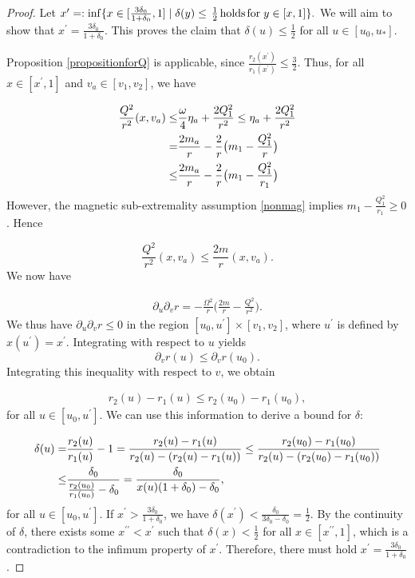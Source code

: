 \documentclass{article}[11pt]
\newcommand{\hsp}{\hspace{.5mm}}
\numberwithin{equation}{section}
\begin{document}
\begin{proof}
Let $x^{\prime} =: \inf \{ x \in [\frac{3\delta_0}{1+\delta_0},1] \mid \delta(y)\leq \hsp  \frac{1}{2}\hsp \text{holds} \hsp \text{for}\hspace{1mm} y\in [x,1]\}.$ We will aim to show that $x^{\prime} = \frac{3\delta_0}{1+\delta_0}.$ This proves the claim that $\delta(u)\leq \frac{1}{2}$ for all $u\in [u_0,u_*]$.

\vspace{3mm}

\noindent Proposition \eqref{propositionforQ} is applicable, since $\frac{r_2(x^{\prime})}{r_1(x^{\prime})}\leq \frac{3}{2}$. Thus, for all $x \in [x^{\prime},1]$ and $v_a \in [v_1,v_2]$, we have

\begin{align} \notag 
\frac{Q^2}{r^2}(x,v_a) \leq& \frac{\omega}{4}\eta_a + \frac{2Q_1^2}{r^2} \leq \eta_a + \frac{2Q_1^2}{r^2} \\ =& \frac{2m_a}{r}- \frac{2}{r}\big(m_1-\frac{Q_1^2}{r}\big) \notag \\ \leq& \frac{2m_a}{r}- \frac{2}{r}\big(m_1-\frac{Q_1^2}{r_1}\big)
\end{align}However, the magnetic sub-extremality assumption  \eqref{nonmag} implies $m_1- \frac{Q_1^2}{r_1} \geq 0$. Hence

\[ \frac{Q^2}{r^2}(x,v_a) \leq \frac{2m}{r}(x,v_a). \]
We now have 

\begin{align}
\partial_u \partial_v r = -\frac{\Omega^2}{r} \big(\frac{2m}{r}-\frac{Q^2}{r^2}\big).
\end{align}We thus have $\partial_u \partial_v r\leq 0$ in the region $[u_0, u^{\prime}]\times [v_1,v_2]$, where $u^{\prime}$ is defined by $x(u^{\prime})=x^{\prime}$. Integrating with respect to $u$ yields \[ \partial_v r(u)\leq \partial_v r(u_0).   \]Integrating this inequality with respect to $v$, we obtain 

\begin{align}
r_2(u)-r_1(u)\leq r_2(u_0)-r_1(u_0),
\end{align}for all $u \in [u_0,u^{\prime}]$. We can use this information to derive a bound for $\delta$:

\begin{align}\notag 
\delta(u)=& \frac{r_2(u)}{r_1(u)}-1 = \frac{r_2(u)-r_1(u)}{r_2(u)-(r_2(u)-r_1(u))} \leq \frac{r_2(u_0)-r_1(u_0)}{r_2(u)-(r_2(u_0)-r_1(u_0))} \notag \\ \leq& \frac{\delta_0}{\frac{r_2(u_0)}{r_1(u_0)}-\delta_0} = \frac{\delta_0}{x(u)(1+\delta_0) -\delta_0},
\end{align}for all $u \in [u_0, u^{\prime}]$. If $x^{\prime}>\frac{3 \delta_0}{1+\delta_0}$, we have $\delta(x^{\prime})< \frac{\delta_0}{3\delta_0-\delta_0}=\frac{1}{2}.$ By the continuity of $\delta$, there exists some $x^{\prime \prime}< x^{\prime}$ such that $\delta(x)< \frac{1}{2}$ for all $x \in [x^{\prime \prime},1]$, which is a contradiction to the infimum property of $x^{\prime}$. Therefore, there must hold $x^{\prime} = \frac{3\delta_0}{1+\delta_0}$.
\end{proof}
\end{document}

